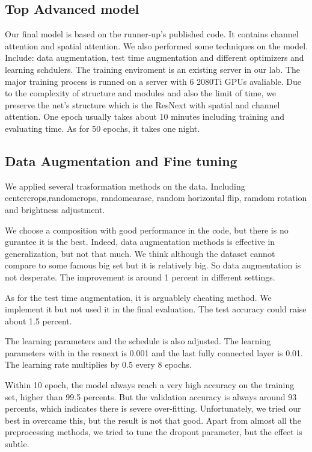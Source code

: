 \subsection{Top Advanced model}
Our final model is based on the runner-up's published code. It contains channel attention and spatial attention. We also performed some techniques on the model. Include: data augmentation, test time augmentation and different optimizers and learning schdulers. The training enviroment is an existing server in our lab. The major training process is runned on a server with 6 2080Ti GPUs avaliable.  Due to the complexity of structure and modules and also the limit of time, we preserve the net's structure  which is the ResNext with spatial and channel attention. One epoch usually takes about 10 minutes including training and evaluating time. As for 50 epochs, it takes one night.

\subsection{Data Augmentation and Fine tuning}
We applied several trasformation methods on the data. Including centercrops,randomcrops, randomearase, random horizontal flip, ramdom rotation and brightness adjustment.

We choose a composition with good performance in the code, but there is no gurantee it is the best. Indeed, data augmentation methods is effective in generalization, but not that much. We think although the dataset cannot compare to some famous big set but it is relatively big. So data augmentation is not desperate. The improvement is around 1 percent in different settings.

As for the test time augmentation, it is arguablely cheating method. We implement it but not used it in the final evaluation. The test accuracy could raise about 1.5 percent.

The learning parameters and the schedule is also adjusted. The learning parameters with in the resnext is 0.001 and the last fully connected layer is 0.01. The learning rate multiplies by 0.5 every 8 epochs.

Within 10 epoch, the model always reach a very high accuracy on the training set, higher than 99.5 percents. But the validation accuracy is always around 93 percents, which indicates there is severe over-fitting. Unfortunately, we tried our best in overcame this, but the result is not that good. Apart from almost all the preprocessing  methods, we tried to tune the dropout parameter, but the effect is subtle.

